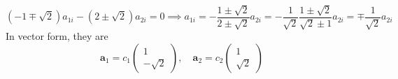\documentclass{article}
\begin{document}
        \begin{equation*}
            (-1 \mp \sqrt 2) a_{1i} - (2 \pm \sqrt 2)a_{2i} = 0 \implies a_{1i} = -\frac{1 \pm \sqrt 2}{2 \pm \sqrt 2} a_{2i} =  -\frac{1}{\sqrt 2}\frac{1 \pm \sqrt 2}{\sqrt 2 \pm 1} a_{2i} = \mp \frac{1}{\sqrt 2} a_{2i}
        \end{equation*}
        In vector form, they are
        \begin{equation*}
            \mathbf{a}_1 = c_1
            \begin{pmatrix*}
                1 \\
                - \sqrt{2}
            \end{pmatrix*}
            , \quad \mathbf{a}_2 = c_2
            \begin{pmatrix*}
                1 \\
                \sqrt 2
            \end{pmatrix*}
        \end{equation*}
\end{document}
